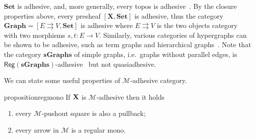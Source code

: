 \documentclass[a4paper,UKenglish,cleveref,pdftex,thm-restate,numberwithinsect]{lipics-v2021}
\newcommand{\cat}[1]{\ensuremath{\mathbf{#1}}}
\def\C{\textbf {\textup{C}}}
\def\X{\textbf {\textup{X}}}
\newcommand{\reg}{\mathsf{Reg}}
\begin{document}
\begin{example}
	\label{ex:adhesive}
	$\cat{Set}$ is adhesive, and, more generally, every topos is
	adhesive~\cite{lack2006toposes}. By the closure properties above, every presheaf $[\cat{X},\cat{Set}]$ is adhesive, thus the category
	$\cat{Graph} = [ E \rightrightarrows V, \cat{Set}]$ is adhesive
	where $E \rightrightarrows {V}$ is the two objects category with two
	morphisms $s,t \colon{E} \to {V}$. Similarly, various
	categories of hypergraphs can be shown to be adhesive, such as term
	graphs and hierarchical graphs~\cite{CastelnovoGM24}. Note that the category $\cat{sGraphs}$ of simple graphs, 
	i.e.~graphs without parallel edges, is
	$\reg{(\cat{sGraphs})}$-adhesive~\cite{BehrHK23} but not
	quasiadhesive.
\end{example}

\iffalse 
\begin{remark}\label{rem:deco}
We can point out an important property of strict $\mathcal{M}$-adhesive categories with pullbacks.  Consider the solid part of the cube aside, whose bottom case is an $\mathcal{M}$-pushout.
	
	\parbox{9.5cm}{	Given an arrow $d\colon X\to D$, we can present the object $X$ has a pushout: indeed, consider the following cube, in which all the three vertical squares are pullbacks.}
	\parbox{3cm}{
	\xymatrix@C=15pt@R=9pt{&V\ar[dd]|\hole_(.65){a}\ar[rr]^{v} \ar@{>.>}[dl]_{u} && Y \ar[dd]^{b} \ar@{>->}[dl]_{y} \\ Z  \ar[dd]_{c}\ar[rr]^(.7){z} & & X \ar[dd]_(.3){d}\\&A\ar[rr]|\hole^(.65){f} \ar@{>->}[dl]^{m} && B \ar@{>->}[dl]^{n} \\C \ar[rr]_{g} & & D }}

Now, notice that, since the front square is a pullback, then the dotted arrow $u\colon V\to Z$ exists. Moreover, the usual composition and decomposition property of pullbacks \cite{mac2013categories} entails that the left face of the cube so obtained is a pullback too, proving that $u$ is in $\mathcal{M}$ and that the top square is a pushout.

	Clearly if the arrow $p\colon X\to D$ is in $\mathcal{M}$, we can omit the assumptions of strictness and the existence of all pullbacks.
\end{remark}
\fi 


We can state some useful properties of $\mathcal{M}$-adhesive category.

\begin{restatable}{proposition}{regmono}\label{prop:regmono}
	If $\X$ is $\mathcal{M}$-adhesive then it holds
	\begin{enumerate}
		\item every $\mathcal{M}$-pushout square is also a pullback;
		\item every arrow in $\mathcal{M}$ is a regular mono.
	\end{enumerate}
\end{restatable}
\end{document}
